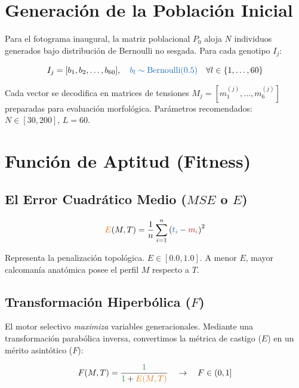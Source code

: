 \documentclass[11pt, a4paper]{article}
\begin{document}
\section{Generación de la Población Inicial}

Para el fotograma inaugural, la matriz poblacional $P_0$ aloja $N$ individuos generados bajo distribución de Bernoulli no sesgada. Para cada genotipo $I_j$:

\begin{equation}
I_j = [b_1, b_2, \dots, b_{60}], \quad \textcolor{coreblue}{b_l \sim \text{Bernoulli}(0.5)} \quad \forall l \in \{1, \dots, 60\}
\end{equation}

Cada vector se decodifica en matrices de tensiones $M_j = [m_1^{(j)}, \dots, m_6^{(j)}]$ preparadas para evaluación morfológica. Parámetros recomendados: $N \in [30, 200]$, $L = 60$.


\section{Función de Aptitud (Fitness)}

\subsection{El Error Cuadrático Medio ($MSE$ o $E$)}
\begin{equation}
\textcolor{coreorange}{E}(M, T) = \frac{1}{n} \sum_{i=1}^{n} \left( \textcolor{coreblue}{t_i} - \textcolor{corered}{m_i} \right)^2 \label{eq:mse}
\end{equation}

Representa la penalización topológica. $E \in [0.0, 1.0]$. A menor $E$, mayor calcomanía anatómica posee el perfil $M$ respecto a $T$.

\subsection{Transformación Hiperbólica ($F$)}
El motor selectivo \textit{maximiza} variables generacionales. Mediante una transformación parabólica inversa, convertimos la métrica de castigo ($E$) en un mérito asintótico ($F$):

\begin{equation}
F(M, T) = \frac{\textcolor{coregreen}{1}}{\textcolor{coregreen}{1} + \textcolor{coreorange}{E(M, T)}} \quad \rightarrow \quad F \in (0, 1]
\end{equation}
\end{document}
